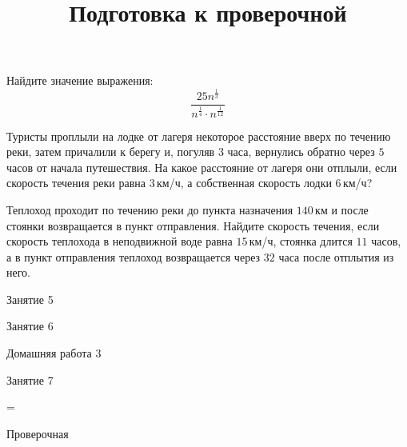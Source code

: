 \begin{homework}[number=2]
	\begin{listofex}
		\item Найдите значение выражения: \[ \dfrac{25n^{\frac{1}{3}}}{n^{\frac{1}{4}}\cdot n^{\frac{1}{12}}} \]
		\item Туристы проплыли на лодке от лагеря некоторое расстояние вверх по течению реки, затем причалили к берегу и, погуляв \( 3 \) часа, вернулись обратно через \( 5 \) часов от начала путешествия. На какое расстояние от лагеря они отплыли, если скорость течения реки равна \( 3 \) км/ч, а собственная скорость лодки \( 6 \) км/ч?
		\item Теплоход проходит по течению реки до пункта назначения \( 140 \) км и после стоянки возвращается в пункт отправления. Найдите скорость течения, если скорость теплохода в неподвижной воде равна \( 15 \) км/ч, стоянка длится \( 11 \) часов, а в пункт отправления теплоход возвращается через \( 32 \) часа после отплытия из него.
	\end{listofex}
\end{homework}

\begin{class}[number=5]
	\begin{listofex}
		\item Занятие 5
	\end{listofex}
\end{class}

\begin{class}[number=6]
	\begin{listofex}
		\item Занятие 6
	\end{listofex}
\end{class}

\begin{homework}[number=3]
	\begin{listofex}
		\item Домашняя работа 3
	\end{listofex}
\end{homework}

\begin{class}[number=7]
	\title{Подготовка к проверочной}
	\begin{listofex}
		\item Занятие 7
	\end{listofex}
\end{class}

=%
\begin{exam}
	\begin{listofex}
		\item Проверочная
	\end{listofex}
\end{exam}
